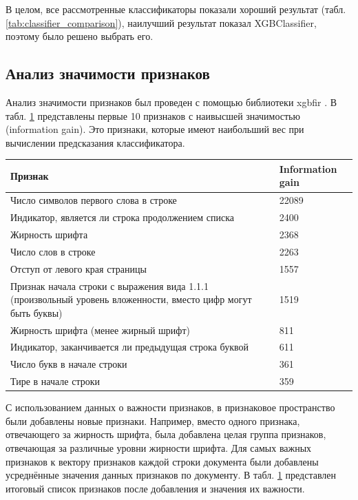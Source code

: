 \documentclass{ProcISPRAS}
\begin{document}
В целом, все рассмотренные классификаторы показали хороший результат (табл. \ref{tab:classifier_comparison}), наилучший результат показал XGBClassifier, поэтому было решено выбрать его.

\subsection{Анализ значимости признаков}

Анализ значимости признаков был проведен с помощью библиотеки xgbfir \cite{xgbfir} . В табл. \ref{tab:features_importances} представлены первые 10 признаков с наивысшей значимостью (information gain). Это признаки, которые имеют наибольший вес при вычислении предсказания классификатора.

\begin{table}[ht]
    \begin{tabular}{p{}p{}}
    \toprule
    \textbf{Признак} & \textbf{Information gain} \\
    \midrule
        Число символов первого слова в строке & 22089 \\
        Индикатор, является ли строка продолжением списка & 2400 \\
        Жирность шрифта & 2368 \\
        Число слов в строке & 2263 \\
        Отступ от левого края страницы & 1557 \\
        Признак начала строки с выражения вида 1.1.1 (произвольный уровень вложенности, вместо цифр могут быть буквы) & 1519 \\
        Жирность шрифта (менее жирный шрифт) & 811 \\
        Индикатор, заканчивается ли предыдущая строка буквой & 611 \\
        Число букв в начале строки & 361 \\
        Тире в начале строки & 359 \\
    \bottomrule
    \end{tabular}
    \label{tab:features_importances}
\end{table}

С использованием данных о важности признаков, в признаковое пространство были добавлены новые признаки. Например, вместо одного признака, отвечающего за жирность шрифта, была добавлена целая группа признаков, отвечающая за различные уровни жирности шрифта. Для самых важных признаков к вектору признаков каждой строки документа были добавлены усреднённые значения данных признаков по документу. В табл. \ref{tab:features_importances} представлен итоговый список признаков после добавления и значения их важности.
\end{document}
